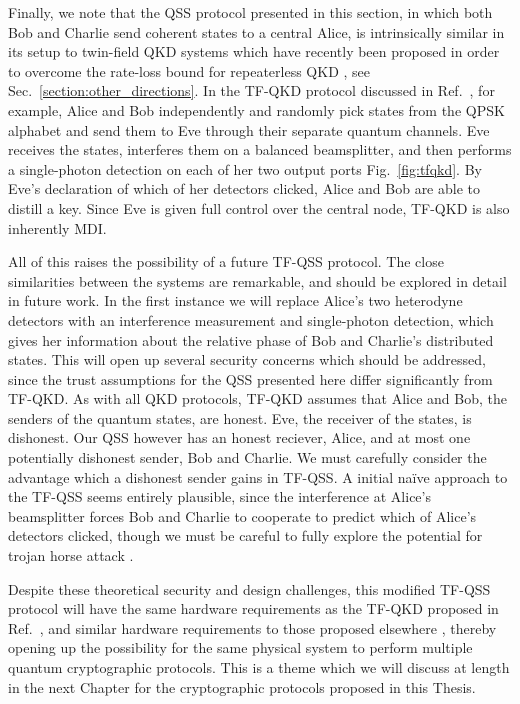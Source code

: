 Finally, we note that the QSS protocol presented in this section, in which both Bob and Charlie send coherent states to a central Alice, is intrinsically similar in its setup to twin-field QKD systems which have recently been proposed in order to overcome the rate-loss bound for repeaterless QKD \cite{Pirandola2017, Lucamarini2018}, see Sec.~\ref{section:other_directions}. In the TF-QKD protocol discussed in Ref.~\cite{Barnett2019}, for example, Alice and Bob independently and randomly pick states from the QPSK alphabet and send them to Eve through their separate quantum channels. Eve receives the states, interferes them on a balanced beamsplitter, and then performs a single-photon detection on each of her two output ports Fig.~\ref{fig:tfqkd}. By Eve's declaration of which of her detectors clicked, Alice and Bob are able to distill a key. Since Eve is given full control over the central node, TF-QKD is also inherently MDI.

All of this raises the possibility of a future TF-QSS protocol. The close similarities between the systems are remarkable, and should be explored in detail in future work. In the first instance we will replace Alice's two heterodyne detectors with an interference measurement and single-photon detection, which gives her information about the relative phase of Bob and Charlie's distributed states. This will open up several security concerns which should be addressed, since the trust assumptions for the QSS presented here differ significantly from TF-QKD. As with all QKD protocols, TF-QKD assumes that Alice and Bob, the senders of the quantum states, are honest. Eve, the receiver of the states, is dishonest. Our QSS however has an honest reciever, Alice, and at most one potentially dishonest sender, Bob and Charlie. We must carefully consider the advantage which a dishonest sender gains in TF-QSS. A initial na\"ive approach to the TF-QSS seems entirely plausible, since the interference at Alice's beamsplitter forces Bob and Charlie to cooperate to predict which of Alice's detectors clicked, though we must be careful to fully explore the potential for trojan horse attack \cite{Deng2005, Qin2006}.

Despite these theoretical security and design challenges, this modified TF-QSS protocol will have the same hardware requirements as the TF-QKD proposed in Ref.~\cite{Barnett2019}, and similar hardware requirements to those proposed elsewhere \cite{Lucamarini2018, Cui2018, Curty2018}, thereby opening up the possibility for the same physical system to perform multiple quantum cryptographic protocols. This is a theme which we will discuss at length in the next Chapter for the cryptographic protocols proposed in this Thesis.





